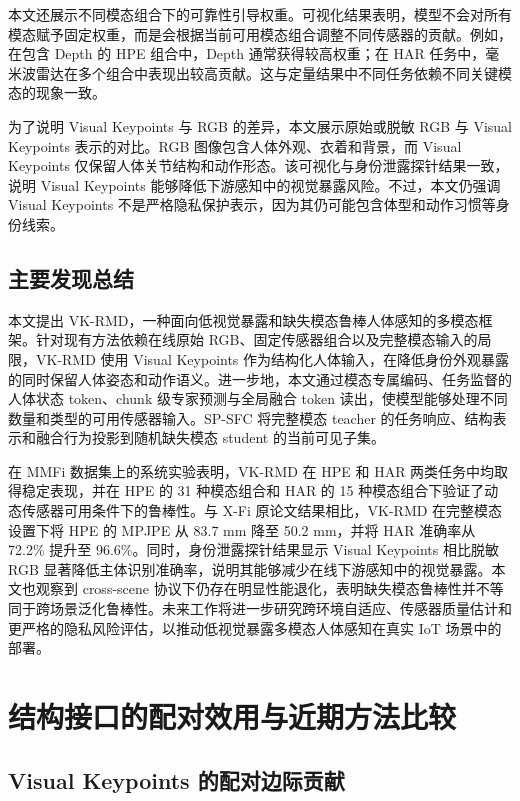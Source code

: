 \documentclass[journal]{IEEEtran}
\newcommand{\parahead}[1]{\vspace{0.4em}\noindent{\textbf{#1}}}
\begin{document}
\parahead{融合权重可视化。}
本文还展示不同模态组合下的可靠性引导权重。可视化结果表明，模型不会对所有模态赋予固定权重，而是会根据当前可用模态组合调整不同传感器的贡献。例如，在包含 Depth 的 HPE 组合中，Depth 通常获得较高权重；在 HAR 任务中，毫米波雷达在多个组合中表现出较高贡献。这与定量结果中不同任务依赖不同关键模态的现象一致。

\parahead{低视觉暴露表示可视化。}
为了说明 Visual Keypoints 与 RGB 的差异，本文展示原始或脱敏 RGB 与 Visual Keypoints 表示的对比。RGB 图像包含人体外观、衣着和背景，而 Visual Keypoints 仅保留人体关节结构和动作形态。该可视化与身份泄露探针结果一致，说明 Visual Keypoints 能够降低下游感知中的视觉暴露风险。不过，本文仍强调 Visual Keypoints 不是严格隐私保护表示，因为其仍可能包含体型和动作习惯等身份线索。


\subsection{主要发现总结}

本文提出 VK-RMD，一种面向低视觉暴露和缺失模态鲁棒人体感知的多模态框架。针对现有方法依赖在线原始 RGB、固定传感器组合以及完整模态输入的局限，VK-RMD 使用 Visual Keypoints 作为结构化人体输入，在降低身份外观暴露的同时保留人体姿态和动作语义。进一步地，本文通过模态专属编码、任务监督的人体状态 token、chunk 级专家预测与全局融合 token 读出，使模型能够处理不同数量和类型的可用传感器输入。SP-SFC 将完整模态 teacher 的任务响应、结构表示和融合行为投影到随机缺失模态 student 的当前可见子集。

在 MMFi 数据集上的系统实验表明，VK-RMD 在 HPE 和 HAR 两类任务中均取得稳定表现，并在 HPE 的 31 种模态组合和 HAR 的 15 种模态组合下验证了动态传感器可用条件下的鲁棒性。与 X-Fi 原论文结果相比，VK-RMD 在完整模态设置下将 HPE 的 MPJPE 从 83.7 mm 降至 50.2 mm，并将 HAR 准确率从 72.2\% 提升至 96.6\%。同时，身份泄露探针结果显示 Visual Keypoints 相比脱敏 RGB 显著降低主体识别准确率，说明其能够减少在线下游感知中的视觉暴露。本文也观察到 cross-scene 协议下仍存在明显性能退化，表明缺失模态鲁棒性并不等同于跨场景泛化鲁棒性。未来工作将进一步研究跨环境自适应、传感器质量估计和更严格的隐私风险评估，以推动低视觉暴露多模态人体感知在真实 IoT 场景中的部署。

\section{结构接口的配对效用与近期方法比较}

\subsection{Visual Keypoints 的配对边际贡献}
\end{document}
